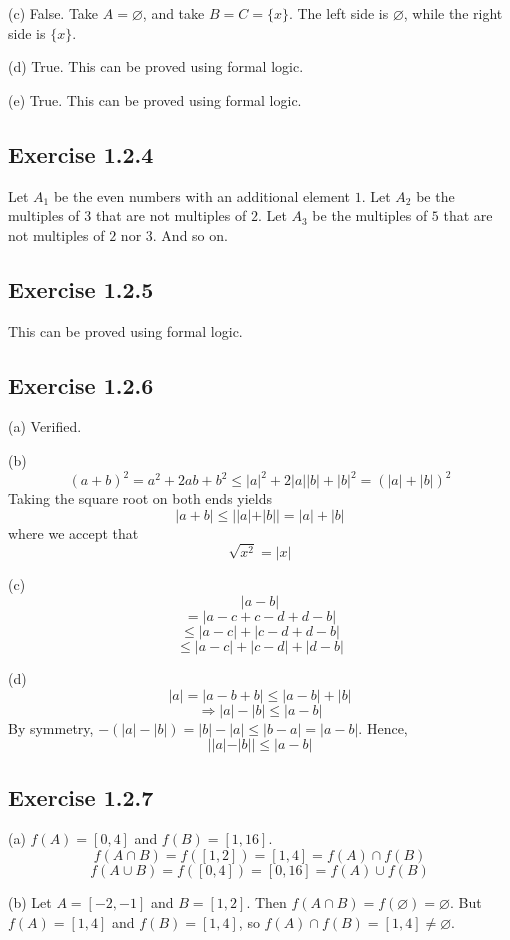 \documentclass{book}
\begin{document}
\noindent
(c)
False. Take $A = \varnothing$, and take $B = C = \{ x \}$. The left side is $\varnothing$, while the right side is $\{ x \}$.

\noindent
(d)
True. This can be proved using formal logic.

\noindent
(e)
True. This can be proved using formal logic.

\subsection*{Exercise 1.2.4}
Let $A_1$ be the even numbers with an additional element $1$. Let $A_2$ be the multiples of $3$ that are not multiples of $2$. Let $A_3$ be the multiples of $5$ that are not multiples of $2$ nor $3$. And so on.

\subsection*{Exercise 1.2.5}
This can be proved using formal logic.

\subsection*{Exercise 1.2.6}
(a)
Verified.

\noindent
(b)
$$(a + b)^2 = a^2 + 2ab + b^2 \leq |a|^2 + 2|a||b| + |b|^2 = (|a| + |b|)^2$$
Taking the square root on both ends yields
$$|a + b| \leq ||a| + |b|| = |a| + |b|$$
where we accept that
$$\sqrt{x^2} = |x|$$

\noindent
(c)
$$|a - b|$$
$$= |a - c + c - d + d - b|$$
$$\leq |a - c| + |c - d + d - b|$$
$$\leq |a - c| + |c - d| + |d - b|$$

\noindent
(d)
$$|a| = |a - b + b| \leq |a - b| + |b|$$
$$\Rightarrow |a| - |b| \leq |a - b|$$
By symmetry, $-(|a| - |b|) = |b| - |a| \leq |b - a| = |a - b|$. Hence,
$$||a| - |b|| \leq |a - b|$$

\subsection*{Exercise 1.2.7}
(a)
$f(A) = [0, 4]$ and $f(B) = [1, 16]$.
$$f(A \cap B) = f([1, 2]) = [1, 4] = f(A) \cap f(B)$$
$$f(A \cup B) = f([0, 4]) = [0, 16] = f(A) \cup f(B)$$

\noindent
(b)
Let $A = [-2, -1]$ and $B = [1, 2]$. Then $f(A \cap B) = f(\varnothing) = \varnothing$. But $f(A) = [1, 4]$ and $f(B) = [1, 4]$, so $f(A) \cap f(B) = [1, 4] \neq \varnothing$.
\end{document}
